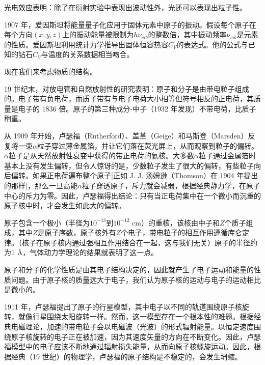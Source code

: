 	光电效应表明：除了在衍射实验中表现出波动性外，光还可以表现出粒子性。

	1907 年，爱因斯坦将能量量子化应用于固体元素中原子的振动。假设每个原子在每个方向$\left(x,y,z\right)$上的振动能量被限制为$h\nu_{vib}$的整数倍，其中振动频率$\nu_{vib}$是元素的性质。爱因斯坦利用统计力学推导出固体恒容热容$C_V$的表达式。他的公式与已知的钻石$C_V$与温度的关系数据相当吻合。

	现在我们来考虑物质的结构。

	19 世纪末，对放电管和自然放射性的研究表明：原子和分子是由带电粒子组成的。电子带有负电荷，而质子带有与电子电荷大小相等但符号相反的正电荷，其质量是电子的 1836 倍。原子的第三种成分-中子（1932 年发现）不带电荷，比质子稍重。

	从 1909 年开始，卢瑟福（Rutherford）、盖革（Geige）和马斯登（Marsden）反复将一束$\alpha$粒子穿过薄金属箔，并让它们落在荧光屏上，从而观察到粒子的偏转。$\alpha$粒子是从天然放射性衰变中获得的带正电荷的氦核。大多数$\alpha$粒子通过金属箔时基本上没有发生偏转，但令人惊讶的是，少数粒子发生了很大的偏转，有些粒子向后偏转。如果正电荷遍布整个原子[正如 J. J. 汤姆逊（Thomson）在 1904 年提出的那样]，那么一旦高能$\alpha$粒子穿透原子，斥力就会减弱，根据经典静力学，在原子中心的斥力为零。因此，卢瑟福得出结论：只有当正电荷集中在一个微小而沉重的原子核中时，才会发生如此大的偏转。

	原子包含一个极小（半径为$10^{-13}$到$10^{-12}$ cm）的重核，该核由中子和$Z$个质子组成，其中$Z$是原子序数，原子核外有$Z$个电子，带电粒子的相互作用遵循库仑定律。（核子在原子核内通过强相互作用结合在一起，这与我们无关）原子的半径约为1 \AA，气体动力学理论的结果就表明了这一点。

	原子和分子的化学性质是由其电子结构决定的，因此就产生了电子运动和能量的性质问题。由于原子核的质量远大于电子，我们认为原子核的运动与电子的运动相比是微小的。

	1911 年，卢瑟福提出了原子的行星模型，其中电子以不同的轨道围绕原子核旋转，就像行星围绕太阳旋转一样。然而，这一模型存在一个根本性的难题。根据经典电磁理论，加速的带电粒子会以电磁波（光波）的形式辐射能量。以恒定速度围绕原子核旋转的电子正在被加速，因为其速度矢量的方向在不断变化。因此，卢瑟福模型中的电子应该不断地通过辐射损失能量，从而向原子核螺旋运动。因此，根据经典（19 世纪）的物理学，卢瑟福的原子结构是不稳定的，会发生坍缩。

